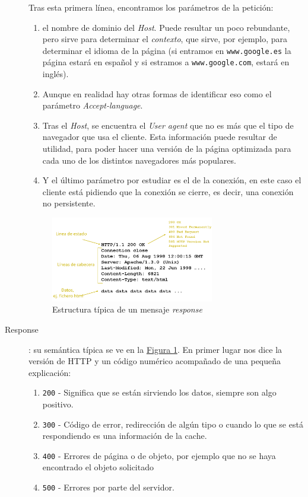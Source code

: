 \documentclass[10pt,a4paper,spanish]{report}
\begin{document}
\begin{description}
  Tras esta primera línea, encontramos los parámetros de la petición:
  \begin{enumerate}[\color{tema2}{$\triangle$}]
    \item el nombre de dominio del \textit{\textcolor{tema2}{Host}}. Puede resultar un poco rebundante, pero sirve para determinar el \textit{\textcolor{tema2}{contexto}}, que sirve, por ejemplo, para determinar el idioma de la página (si entramos en \texttt{www.google.es} la página estará en español y si estramos a \texttt{www.google.com}, estará en inglés).
    \item Aunque en realidad hay otras formas de identificar eso como el parámetro \textit{\textcolor{tema2}{Accept-language}}.
    \item Tras el \textit{\textcolor{tema2}{Host}}, se encuentra el \textit{\textcolor{tema2}{User agent}} que no es más que el tipo de navegador que usa el cliente. Esta información puede resultar de utilidad, para poder hacer una versión de la página optimizada para cada uno de los distintos navegadores más populares.
    \item Y el último parámetro por estudiar es el de la conexión, en este caso el cliente está pidiendo que la conexión se cierre, es decir, una conexión no persistente.
  \end{enumerate}

  \begin{figure}[!h]
    \centering
    \includegraphics[width=0.7\textwidth]{tema2_6}
    \caption{Estructura típica de un mensaje \textit{response}}
    \label{estrres}
  \end{figure}

  \item[Response]: su semántica típica se ve en la \hyperref[estrres]{Figura \ref*{estrres}}. En primer lugar nos dice la versión de HTTP y un código numérico acompañado de una pequeña explicación:
  \begin{enumerate}[\color{tema2}{$\clubsuit$}]
    \item \texttt{200} - Significa que se están sirviendo los datos, siempre son algo positivo.
    \item \texttt{300} - Código de error, redirección de algún tipo o cuando lo que se está respondiendo es una información de la cache.
    \item \texttt{400} - Errores de página o de objeto, por ejemplo que no se haya encontrado el objeto solicitado
    \item \texttt{500} - Errores por parte del servidor.
  \end{enumerate}


\end{description}
\end{document}
